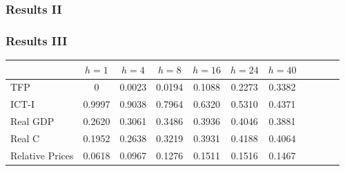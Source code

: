 \documentclass{beamer}
\def \MainFigures{../Draft_Summer2018/MainFigures}
\def\myFigWidth{2.0in}
\begin{document}
\begin{frame}
	\frametitle{Results II}
	\label{results2}

\begin{figure}[h!]
{} \hspace{.2in%
} 
 \hspace{.2in%
} 
 \hspace{.2in%
} 
\end{figure}	


\hyperlink{largeVAR}{}	
\end{frame}

\begin{frame}
	\frametitle{Results III}
	
\begin{table}[h!]
 		\begin{center}
 \begin{tabular}{lcccccccccc}
\hline
 	& $h = 1$ & $h = 4$ & $h = 8$ & $h = 16$ & $h = 24$ & $h = 40$ \\
 	\hline
TFP &  0       &  0.0023  &  0.0194 &   0.1088 &   0.2273  &  0.3382 \\
ICT-I &  0.9997  &  0.9038  &  0.7964 &   0.6320 &   0.5310  &  0.4371 \\
Real GDP &  0.2620  &  0.3061  &  0.3486 &   0.3936 &   0.4046  &  0.3881 \\
Real C &  0.1952  &  0.2638  &  0.3219 &   0.3931 &   0.4188  &  0.4064 \\
Relative Prices &  0.0618  &  0.0967  &  0.1276 &   0.1511 &   0.1516  &  0.1467 \\	
\hline
 	\end{tabular}
  \label{table:vardec}
  \end{center}
 \end{table}


\end{frame}
\end{document}
